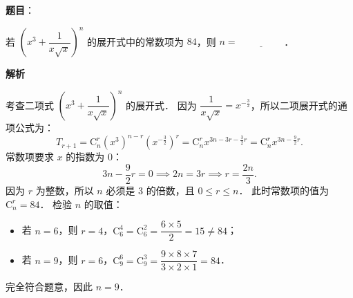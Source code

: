 \begin{answer}

\textbf{题目}：

若 $\left(x^3 + \dfrac{1}{x\sqrt{x}}\right)^n$ 的展开式中的常数项为 $84$，则 $n = \underline{\hspace{2cm}}$．

\textbf{解析}

考查二项式 $\left(x^3 + \dfrac{1}{x\sqrt{x}}\right)^n$ 的展开式．
因为 $\dfrac{1}{x\sqrt{x}} = x^{-\frac{3}{2}}$，所以二项展开式的通项公式为：
\nopagebreak[4]
\[
T_{r+1} = \mathrm{C}_n^r (x^3)^{n-r} (x^{-\frac{3}{2}})^r = \mathrm{C}_n^r x^{3n - 3r - \frac{3}{2}r} = \mathrm{C}_n^r x^{3n - \frac{9}{2}r}.
\]
常数项要求 $x$ 的指数为 $0$：
\nopagebreak[4]
\[
3n - \frac{9}{2}r = 0 \implies 2n = 3r \implies r = \frac{2n}{3}.
\]
因为 $r$ 为整数，所以 $n$ 必须是 $3$ 的倍数，且 $0 \leqslant r \leqslant n$．
此时常数项的值为 $\mathrm{C}_n^r = 84$．
检验 $n$ 的取值：
\begin{itemize}
\item 若 $n = 6$，则 $r = 4$，$\mathrm{C}_6^4 = \mathrm{C}_6^2 = \dfrac{6 \times 5}{2} = 15 \neq 84$；
\item 若 $n = 9$，则 $r = 6$，$\mathrm{C}_9^6 = \mathrm{C}_9^3 = \dfrac{9 \times 8 \times 7}{3 \times 2 \times 1} = 84$．
\end{itemize}
完全符合题意，因此 $n = 9$．


\end{answer}
